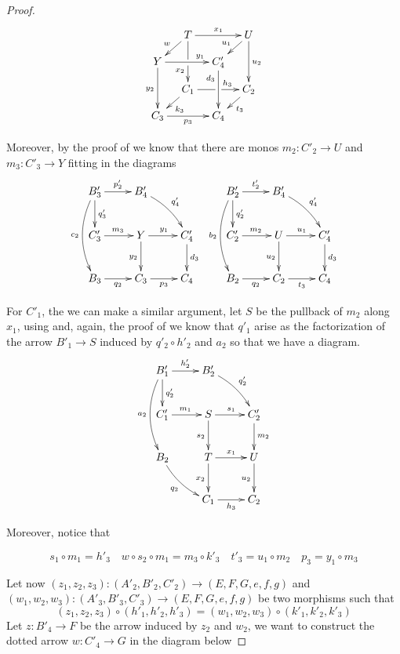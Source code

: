 \begin{proof}
\[\xymatrix@C=10pt@R=10pt{&T\ar[dd]|\hole_(.65){x_2}\ar[rr]^{x_1} \ar[dl]_{w} && U \ar[dd]^{u_2} \ar[dl]_{u_1} \\ Y  \ar[dd]_{y_2}\ar[rr]^(.7){y_1} & & C'_4 \ar[dd]_(.3){d_3}\\&C_1\ar[rr]|\hole^(.65){h_3} \ar[dl]^{k_3} && C_2 \ar[dl]^{t_3} \\C_3 \ar[rr]_{p_3} & & C_4}\]

Moreover, by the proof of  we know that there are monos $m_2\colon C'_2\to U $ and $m_3\colon C'_3\to Y$ fitting in the diagrams
\[\xymatrix{B'_3\ar[r]^{p'_2} \ar[d]^{q'_3} \ar@/_.4cm/[dd]_{c_2}& B'_4\ar@/^.2cm/[dr]^{q'_4} && B'_2 \ar@/_.4cm/[dd]_{b_2} \ar[r]^{t'_2} \ar[d]^{q'_2}& B'_4 \ar@/^.2cm/[dr]^{q'_4} \\C'_3  \ar[r]^{m_3}& Y \ar[r]^{y_1} \ar[d]_{y_2} & C'_4 \ar[d]^{d_3} &C'_2 \ar[r]^{m_2}& U\ar[r]^{u_1} \ar[d]_{u_2} & C'_4 \ar[d]^{d_3}\\  B_3  \ar[r]_{q_2}& C_3 \ar[r]_{p_3}& C_4 &B_2 \ar[r]_{q_2}&  C_2 \ar[r]_{t_3}& C_4}\]

For $C'_1$, the we can make a similar argument, let $S$ be the pullback of $m_2$ along $x_1$, using  and, again, the proof of  we know that $q'_1$ arise as the factorization of the arrow $B'_1\to S$ induced by $q'_2\circ h'_2$ and $a_2$ so that we have a diagram.
	\[\xymatrix{ B'_1 \ar@/_.4cm/[dd]_{a_2} \ar[r]^{h'_2} \ar[d]^{q'_2}& B'_2 \ar@/^.2cm/[dr]^{q'_2} \\C'_1 \ar[r]^{m_1}& S\ar[r]^{s_1} \ar[d]_{s_2}&C'_2 \ar[d]^{m_2}\\  B_2 \ar@/_.2cm/[dr]_{q_2}&  T \ar[r]^{x_1} \ar[d]_{x_2}& U \ar[d]_{u_2} \\ & C_1 \ar[r]_{h_3}&  C_2}\]

Moreover, notice that 

\[s_1\circ m_1 = h'_3 \quad w\circ s_2\circ m_1=  m_3\circ k'_3 \quad t'_3=u_1\circ m_2 \quad p_3=y_1\circ m_3\]

Let now $(z_1, z_2, z_3)\colon (A'_2, B'_2, C'_2)\to (E, F, G, e, f, g)$ and $(w_1, w_2, w_3)\colon (A'_3, B'_3, C'_3)\to (E, F, G, e, f, g)$ be two morphisms such that 
\[(z_1, z_2, z_3)\circ (h'_1, h'_2, h'_3)=(w_1, w_2, w_3)\circ (k'_1, k'_2, k'_3)\] 
Let $z\colon B'_4\to F$ be the arrow induced by $z_2$ and $w_2$, we want to construct the dotted arrow $w\colon C'_4 \to G$ in the diagram below
 

\end{proof}
